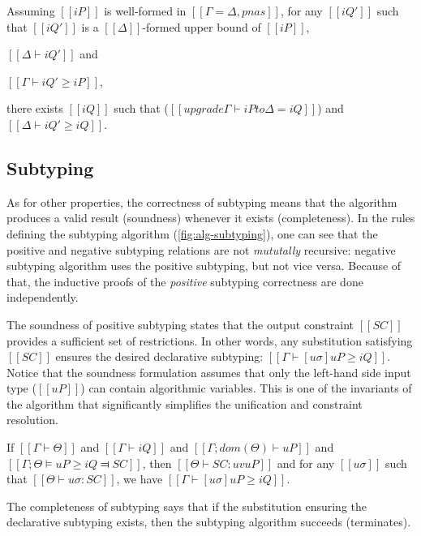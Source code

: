     \begin{lemma*}
        Assuming $[[iP]]$ is well-formed in $[[Γ = Δ, pnas]]$,
        for any $[[iQ']]$ such that $[[iQ']]$ is a $[[Δ]]$-formed upper bound of $[[iP]]$, \ie
        \begin{enumerate*}
            \item $[[Δ ⊢ iQ']]$ and
            \item $[[Γ ⊢ iQ' ≥ iP]]$,
        \end{enumerate*}
        there exists $[[iQ]]$ such that
        ($[[upgrade Γ ⊢ iP to Δ = iQ]]$) and $[[Δ ⊢ iQ' ≥ iQ]]$.
    \end{lemma*}

\subsection{Subtyping}
    \label{sec:proof-subtyping}

    As for other properties, the correctness of subtyping means that the
    algorithm produces a valid result (soundness) whenever it exists
    (completeness). In the rules defining the subtyping algorithm
    (\cref{fig:alg-subtyping}), one can see that the positive and negative
    subtyping relations are not \emph{mututally} recursive: negative subtyping
    algorithm uses the positive subtyping, but not vice versa. Because of that,
    the inductive proofs of the \emph{positive} subtyping correctness are done
    independently.

    The soundness of positive subtyping states that the output constraint
    $[[SC]]$ provides a sufficient set of restrictions. In other words, any
    substitution satisfying $[[SC]]$ ensures the desired declarative subtyping:
    $[[Γ ⊢ [uσ]uP ≥ iQ]]$. Notice that the soundness formulation assumes that
    only the left-hand side input type ($[[uP]]$) can contain algorithmic
    variables. This is one of the invariants of the algorithm that significantly
    simplifies the unification and constraint resolution.

\begin{lemma*}
    If $[[Γ ⊢ Θ]]$ and $[[Γ ⊢ iQ]]$ and $[[Γ ; dom(Θ) ⊢  uP]]$ and 
    $[[Γ ; Θ ⊨ uP ≥ iQ ⫤ SC]]$,
    then $[[Θ ⊢ SC : uv uP]]$ and
    for any  $[[uσ]]$ such that $[[ Θ ⊢ uσ : SC ]]$,
    we have $[[ Γ ⊢ [uσ]uP ≥ iQ ]]$.
\end{lemma*}

    The completeness of subtyping says that if the substitution 
    ensuring the declarative subtyping exists, then the subtyping algorithm 
    succeeds (terminates).

